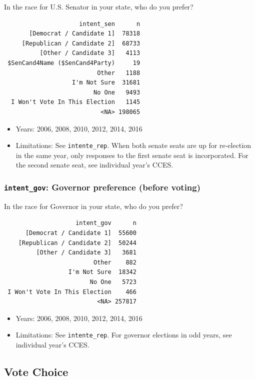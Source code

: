 \documentclass[10pt,article,oneside]{memoir}
\theoremstyle{definition}
\begin{document}
In the race for U.S. Senator in your state, who do you prefer?

\begin{verbatim}
                     intent_sen      n
       [Democrat / Candidate 1]  78318
     [Republican / Candidate 2]  68733
          [Other / Candidate 3]   4113
 $SenCand4Name ($SenCand4Party)     19
                          Other   1188
                   I'm Not Sure  31681
                         No One   9493
  I Won't Vote In This Election   1145
                           <NA> 198065
\end{verbatim}

\begin{itemize}
\tightlist
\item
  Years: 2006, 2008, 2010, 2012, 2014, 2016
\item
  Limitations: See \texttt{intente\_rep}. When both senate seats are up
  for re-election in the same year, only responses to the first senate
  seat is incorporated. For the second senate seat, see individual
  year's CCES.
\end{itemize}

\subsubsection{\texorpdfstring{\texttt{intent\_gov}: Governor preference
(before
voting)}{intent\_gov: Governor preference (before voting)}}\label{intent_gov-governor-preference-before-voting}

In the race for Governor in your state, who do you prefer?

\begin{verbatim}
                    intent_gov      n
      [Democrat / Candidate 1]  55600
    [Republican / Candidate 2]  50244
         [Other / Candidate 3]   3681
                         Other    882
                  I'm Not Sure  18342
                        No One   5723
 I Won't Vote In This Election    466
                          <NA> 257817
\end{verbatim}

\begin{itemize}
\tightlist
\item
  Years: 2006, 2008, 2010, 2012, 2014, 2016
\item
  Limitations: See \texttt{intente\_rep}. For governor elections in odd
  years, see individual year's CCES.
\end{itemize}

\subsection{Vote Choice}\label{vote-choice}
\end{document}
